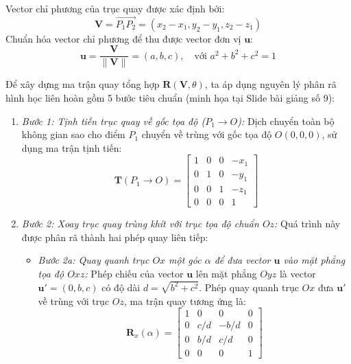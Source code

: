 Vector chỉ phương của trục quay được xác định bởi:
\begin{equation}
\mathbf{V} = \vec{P_1 P_2} = (x_2 - x_1, y_2 - y_1, z_2 - z_1)
\end{equation}
Chuẩn hóa vector chỉ phương để thu được vector đơn vị $\mathbf{u}$:
\begin{equation}
\label{eq:unit_vector_u}
\mathbf{u} = \frac{\mathbf{V}}{\|\mathbf{V}\|} = (a, b, c), \quad \text{với } a^2 + b^2 + c^2 = 1
\end{equation}

Để xây dựng ma trận quay tổng hợp $\mathbf{R}(\mathbf{V}, \theta)$, ta áp dụng nguyên lý phân rã hình học liên hoàn gồm 5 bước tiêu chuẩn (minh họa tại Slide bài giảng số 9):
\begin{enumerate}
    \item \textit{Bước 1: Tịnh tiến trục quay về gốc tọa độ ($P_1 \to O$):} Dịch chuyển toàn bộ không gian sao cho điểm $P_1$ chuyển về trùng với gốc tọa độ $O(0, 0, 0)$, sử dụng ma trận tịnh tiến:
    \begin{equation}
    \mathbf{T}(P_1 \to O) = \begin{bmatrix} 1 & 0 & 0 & -x_1 \\ 0 & 1 & 0 & -y_1 \\ 0 & 0 & 1 & -z_1 \\ 0 & 0 & 0 & 1 \end{bmatrix}
    \end{equation}
    \item \textit{Bước 2: Xoay trục quay trùng khít với trục tọa độ chuẩn $Oz$:} Quá trình này được phân rã thành hai phép quay liên tiếp:
    \begin{itemize}
        \item \textit{Bước 2a: Quay quanh trục $Ox$ một góc $\alpha$ để đưa vector $\mathbf{u}$ vào mặt phẳng tọa độ $Oxz$:} Phép chiếu của vector $\mathbf{u}$ lên mặt phẳng $Oyz$ là vector $\mathbf{u}' = (0, b, c)$ có độ dài $d = \sqrt{b^2 + c^2}$. Phép quay quanh trục $Ox$ đưa $\mathbf{u}'$ về trùng với trục $Oz$, ma trận quay tương ứng là:
        \begin{equation}
        \label{eq:rx_alpha}
        \mathbf{R}_x(\alpha) = \begin{bmatrix} 1 & 0 & 0 & 0 \\ 0 & c/d & -b/d & 0 \\ 0 & b/d & c/d & 0 \\ 0 & 0 & 0 & 1 \end{bmatrix}
        \end{equation}

\end{itemize}
\end{enumerate}
